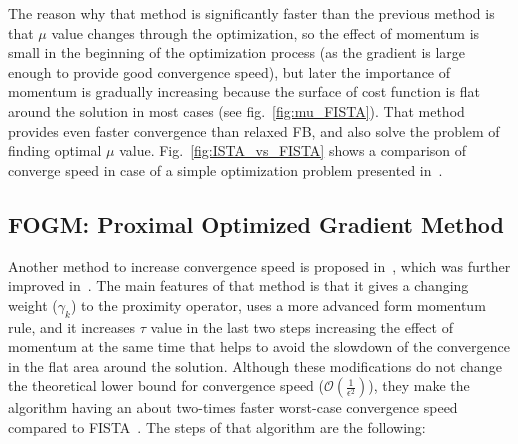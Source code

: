 The reason why that method is significantly faster than the previous method is that $\mu$ value changes through the optimization, so the effect of momentum is small in the beginning of the optimization process (as the gradient is large enough to provide good convergence speed), but later the importance of momentum is gradually increasing because the surface of cost function is flat around the solution in most cases (see fig.~\ref{fig:mu_FISTA}). That method provides even faster convergence than relaxed FB, and also solve the problem of finding optimal $\mu$ value. Fig.~\ref{fig:ISTA_vs_FISTA} shows a comparison of converge speed in case of a simple optimization problem presented in~\cite{peyre_2011}.



\subsection{FOGM: Proximal Optimized Gradient Method}
Another method to increase convergence speed is proposed in~\cite{hendrickx_2018}, which was further improved in~\cite{gueddari_2018}. The main features of that method is that it gives a changing weight ($\gamma_k$) to the proximity operator, uses a more advanced form momentum rule, and it increases $\tau$ value in the last two steps increasing the effect of momentum at the same time that helps to avoid the slowdown of the convergence in the flat area around the solution. Although these modifications do not change the theoretical lower bound for convergence speed ($\mathcal{O}(\frac{1}{\epsilon^2})$), they make the algorithm having an about two-times faster worst-case convergence speed compared to FISTA~\cite{kim, taylor}. The steps of that algorithm are the following:

